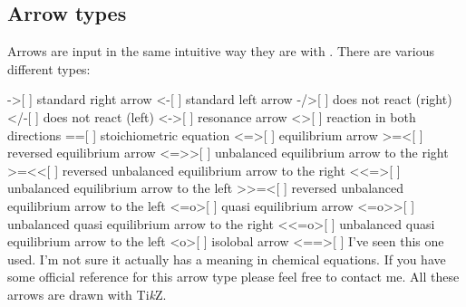 \documentclass[load-preamble+]{cnltx-doc}
\makeatletter
\newcommand*\cf@arrow{%
  \@ifstar
    {\cf@arrow@star}
    {\cf@arrow@nostar}%
}
\newenvironment{arrows}
  {%
    \let\arrow\cf@arrow
    \cnltxlist
  }
  {\endcnltxlist}
\newcommand*\TikZ{Ti\textit{k}Z}
\makeatother
\begin{document}
\subsection{Arrow types}
Arrows are input in the same intuitive way they are with .
There are various different types:
\begin{arrows}
  \arrow{->}[ \charrow{->}]
    standard right arrow
  \arrow{<-}[ \charrow{<-}]
    standard left arrow
  \arrow{-/>}[ \charrow{-/>}]
    does not react (right)
  \arrow{</-}[ \charrow{</-}]
    does not react (left)
  \arrow{<->}[ \charrow{<->}]
    resonance arrow
  \arrow{<>}[ \charrow{<>}]
    reaction in both directions
  \arrow{==}[ \charrow{==}]
    stoichiometric equation
  \arrow{<=>}[ \charrow{<=>}]
    equilibrium arrow
  \arrow{>=<}[ \charrow{>=<}]
    reversed equilibrium arrow
  \arrow{<=>{}>}[ \charrow{<=>>}]
    unbalanced equilibrium arrow to the right
  \arrow{>=<{}<}[ \charrow{>=<<}]
    reversed unbalanced equilibrium arrow to the right
  \arrow{<{}<=>}[ \charrow{<<=>}]
    unbalanced equilibrium arrow to the left
  \arrow{>{}>=<}[ \charrow{>>=<}]
    reversed unbalanced equilibrium arrow to the left
  \arrow{<=o>}[ ]
    quasi equilibrium arrow
  \arrow{<=o>{}>}[ ]
    unbalanced quasi equilibrium arrow to the right
  \arrow{<{}<=o>}[ ]
    unbalanced quasi equilibrium arrow to the left
  \arrow{<o>}[ ]
    isolobal arrow
  \arrow{<==>}[ \charrow{<==>}]
    I've seen this one used. I'm not sure it actually has a
    meaning in chemical equations.  If you have some official reference for
    this arrow type please feel free to contact me.
\end{arrows}
All these arrows are drawn with \TikZ.
\begin{example}
   \par
   \par
   \par
  \ch{\{[CH2=CH-CH2]- <-> {}[CH2-CH=CH2]- \}} \par
   \par
   \par
\end{example}
\end{document}
